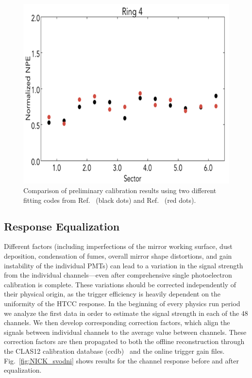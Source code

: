 \begin{figure}[ht]
\centering
\includegraphics[width=0.99\linewidth]{images/WILLIAM_4.png}
\caption{Comparison of preliminary calibration results using two different fitting codes from
  Ref.~\cite{bellamy1996} (black dots) and Ref.~\cite{degtiarenko2017} (red dots).}
\label{fig:WILLIAM_4}
\end{figure}

\subsection{Response Equalization}

Different factors (including imperfections of the mirror working surface, dust deposition, condensation of fumes,
overall mirror shape distortions, and gain instability of the individual PMTs) can lead to a variation in the signal
strength from the individual channels---even after comprehensive single photoelectron calibration is complete.
These variations should be corrected independently of their physical origin, as the trigger efficiency is heavily
dependent on the uniformity of the HTCC response. In the beginning of every physics run period we analyze the
first data in order to estimate the signal strength in each of the 48 channels. We then develop corresponding
correction factors, which align the signals between individual channels to the average value between channels. These
correction factors are then propagated to both the offline reconstruction through the CLAS12 calibration database
(ccdb)~\cite{recon-nim} and the online trigger gain files. Fig.~\ref{fig:NICK_svodni} shows results for the
channel response before and after equalization.

